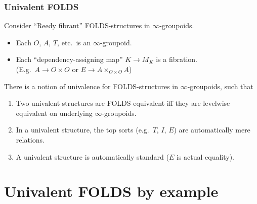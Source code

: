\documentclass{beamer}
\begin{document}
\begin{frame}
  \frametitle{Univalent FOLDS}
  Consider ``Reedy fibrant'' FOLDS-structures in $\infty$-groupoids.
  \begin{itemize}
  \item Each $O$, $A$, $T$, etc.\ is an $\infty$-groupoid.
  \item Each ``dependency-assigning map'' $K\to M_K$ is a fibration.\\
    (E.g.\ $A \to O\times O$ or $E\to A\times_{O\times O} A$)
  \end{itemize}
  \begin{theorem}[in progress]
    There is a notion of \alert{univalence} for FOLDS-structures in $\infty$-groupoids, such that
    \begin{enumerate}
    \item Two univalent structures are FOLDS-equivalent iff they are levelwise equivalent on underlying $\infty$-groupoids.
    \item In a univalent structure, the top sorts (e.g.\ $T$, $I$, $E$) are {automatically} mere relations.
    \item A univalent structure is automatically standard ($E$ is actual equality).
    \end{enumerate}
  \end{theorem}
\end{frame}

\section{Univalent FOLDS by example}
\label{sec:univalent-folds-eg}
\end{document}
